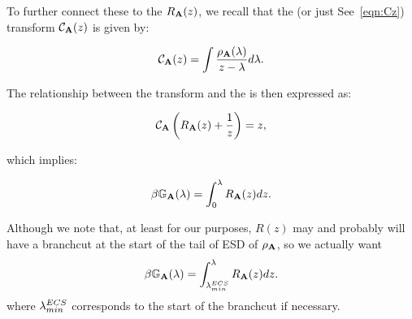 To further connect these to the \RTransform $R_{\mathbf{A}}(z)$, we recall that the \CauchyStieltjes (or just \Cauchy See~\ref{eqn:Cz}) transform $\mathcal{C}_{\mathbf{A}}(z)$  is given by:

\begin{equation}
\mathcal{C}_{\mathbf{A}}(z) = \int \frac{\rho_{\mathbf{A}}(\lambda)}{z - \lambda} d\lambda.
\end{equation}

The relationship between the \Cauchy transform and the \RTransform is  then expressed as:

\begin{equation}
\mathcal{C}_{\mathbf{A}}\left(R_{\mathbf{A}}(z) + \frac{1}{z}\right) = z,
\end{equation}

which implies:

\begin{equation}
\beta\mathbb{G}_{\mathbf{A}}(\lambda) = \int_0^{\lambda} R_{\mathbf{A}}(z) dz.
\end{equation}

Although we note that, at least for our purposes, $R(z)$ may and probably
will have a branchcut at the start of the tail of ESD of $\rho_{\mathbf{A}}$,
so we actually want
\begin{equation}
\beta\mathbb{G}_{\mathbf{A}}(\lambda) = \int_{\lambda^{ECS}_{min}}^{\lambda} R_{\mathbf{A}}(z) dz.
\end{equation}
where $\lambda^{ECS}_{min}$ corresponds to the start of the branchcut if necessary.







